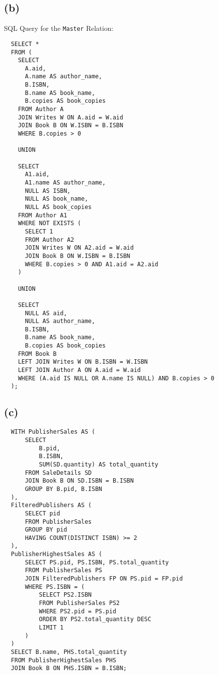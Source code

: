 \documentclass{article}
\begin{document}
\newpage
\subsection*{(b)}
SQL Query for the \texttt{Master} Relation:
\begin{lstlisting}
  SELECT *
  FROM (
    SELECT
      A.aid,
      A.name AS author_name,
      B.ISBN,
      B.name AS book_name,
      B.copies AS book_copies
    FROM Author A
    JOIN Writes W ON A.aid = W.aid
    JOIN Book B ON W.ISBN = B.ISBN
    WHERE B.copies > 0

    UNION

    SELECT
      A1.aid,
      A1.name AS author_name,
      NULL AS ISBN,
      NULL AS book_name,
      NULL AS book_copies
    FROM Author A1
    WHERE NOT EXISTS (
      SELECT 1
      FROM Author A2
      JOIN Writes W ON A2.aid = W.aid
      JOIN Book B ON W.ISBN = B.ISBN
      WHERE B.copies > 0 AND A1.aid = A2.aid
    )

    UNION

    SELECT
      NULL AS aid,
      NULL AS author_name,
      B.ISBN,
      B.name AS book_name,
      B.copies AS book_copies
    FROM Book B
    LEFT JOIN Writes W ON B.ISBN = W.ISBN
    LEFT JOIN Author A ON A.aid = W.aid
    WHERE (A.aid IS NULL OR A.name IS NULL) AND B.copies > 0
  );
\end{lstlisting}

\newpage
\subsection*{(c)}
\begin{lstlisting}
  WITH PublisherSales AS (
      SELECT
          B.pid,
          B.ISBN,
          SUM(SD.quantity) AS total_quantity
      FROM SaleDetails SD
      JOIN Book B ON SD.ISBN = B.ISBN
      GROUP BY B.pid, B.ISBN
  ),
  FilteredPublishers AS (
      SELECT pid
      FROM PublisherSales
      GROUP BY pid
      HAVING COUNT(DISTINCT ISBN) >= 2
  ),
  PublisherHighestSales AS (
      SELECT PS.pid, PS.ISBN, PS.total_quantity
      FROM PublisherSales PS
      JOIN FilteredPublishers FP ON PS.pid = FP.pid
      WHERE PS.ISBN = (
          SELECT PS2.ISBN
          FROM PublisherSales PS2
          WHERE PS2.pid = PS.pid
          ORDER BY PS2.total_quantity DESC
          LIMIT 1
      )
  )
  SELECT B.name, PHS.total_quantity
  FROM PublisherHighestSales PHS
  JOIN Book B ON PHS.ISBN = B.ISBN;
\end{lstlisting}

\newpage
\end{document}
